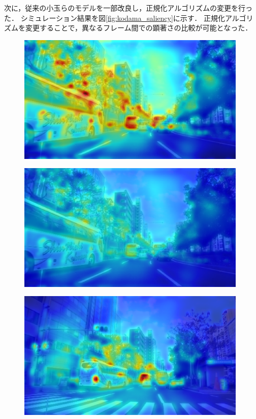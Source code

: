 \vspace{-2mm}

次に，従来の小玉らのモデルを一部改良し，正規化アルゴリズムの変更を行った．
シミュレーション結果を図\ref{fig:kodama_saliency}に示す．
正規化アルゴリズムを変更することで，異なるフレーム間での顕著さの比較が可能となった．
\vspace{-1.0mm}
\begin{figure}[h]
    \begin{minipage}[h]{0.5\hsize}
      \centering
      \includegraphics[width=0.98\textwidth]{./fig/132_before.eps}
      \label{fig:kodama_before}
    \end{minipage}
    \begin{minipage}[h]{0.5\hsize}
      \centering
      \includegraphics[width=0.98\textwidth]{./fig/132_after.eps}
      \label{fig:kodama_after}
    \end{minipage}
    \begin{minipage}[h]{0.5\hsize}
      \centering
      \vspace{-3.2mm}
      \includegraphics[width=0.98\textwidth]{./fig/101_before.eps}

\end{minipage}
\end{figure}
